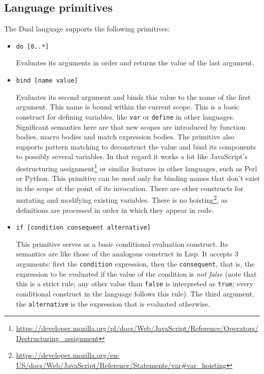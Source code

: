 \subsection{Language primitives}
The Dual language supports the following primitives:
\begin{itemize}
    \item \texttt{do [0..*]}
    
    Evaluates its arguments in order and returns the value of the last argument.
    
    \item \texttt{bind [name value]}
    
    Evaluates its second argument and binds this value to the name of the first argument. This name is bound within the current scope. This is a basic construct for defining variables, like \texttt{var} or \texttt{define} in other languages. Significant semantics here are that new scopes are introduced by function bodies, macro bodies and match expression bodies. The primitive also supports pattern matching to deconstruct the value and bind its components to possibly several variables. In that regard it works a lot like JavaScript's destructuring assignment\footnote{\url{https://developer.mozilla.org/pl/docs/Web/JavaScript/Reference/Operators/Destructuring_assignment}} or similar features in other languages, such as Perl or Python. This primitive can be used only for binding names that don't exist in the scope at the point of its invocation. There are other constructs for mutating and modifying existing variables. There is no hoisting\footnote{\url{https://developer.mozilla.org/en-US/docs/Web/JavaScript/Reference/Statements/var\#var_hoisting}}, as definitions are processed in order in which they appear in code.
    
    \item \texttt{if [condition consequent alternative]}
    
    This primitive serves as a basic conditional evaluation construct. Its semantics are like those of the analogous construct in Lisp. It accepts 3 arguments: first the \texttt{condition} expression, then the \texttt{consequent}, that is, the expression to be evaluated if the value of the condition is \textit{not false} (note that this is a strict rule; any other value than \texttt{false} is interpreted as \texttt{true}; every conditional construct in the language follows this rule). The third argument, the \texttt{alternative} is the expression that is evaluated otherwise.
    

\end{itemize}
